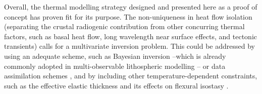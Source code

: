 Overall, the thermal modelling strategy designed and presented here as a proof of concept has proven fit for its purpose.
The non-uniqueness in heat flow isolation (separating the crustal radiogenic contribution from other concurring thermal factors, such as basal heat flow, long wavelength near surface effects, and tectonic transients) calls for a multivariate inversion problem.
This could be addressed by using an adequate scheme, such as Bayesian inversion \parencite{Mosegaard1995} --which is already commonly adopted in multi-observable lithospheric modelling \parencite[e.g ][]{Mather2018}-- or data assimilation schemes \parencites[e.g. the ES-MDA method:][]{Emerick2013}{Limberger2018}, and by including other temperature-dependent constraints, such as the effective elastic thickness \parencite{Burov1995} and its effects on flexural isostasy \parencites{Wienecke2007}{Watts2017}.

